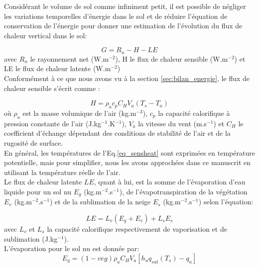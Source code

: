 \noindent Considérant le volume de sol comme infiniment petit, il est possible de négliger les variations temporelles d'énergie dans le sol et de réduire l'équation de conservation de l'énergie pour donner une estimation de l'évolution du flux de chaleur vertical dans le sol:

\begin{equation}
\label{eq_fluxsol_3L}
G = R_{n} - H - LE
\end{equation}
avec $R_{n}$ le rayonnement net (W.m$^{-2}$), H le flux de chaleur sensible (W.m$^{-2}$) et LE le flux de chaleur latente (W.m$^{-2}$)\\

\noindent Conformément à ce que nous avons vu à la section \ref{sec:bilan_energie}, le flux de chaleur sensible s'écrit comme : 

\begin{equation}
\label{eq_sensheat}
H = \rho_{a}c_{p}C_{H}V_{a}(T_{s}-T_{a})
\end{equation}
où $\rho_{a}$ est la masse volumique de l'air (kg.m$^{-3}$), $c_{p}$ la capacité calorifique à pression constante de l'air (J.kg$^{-1}$.K$^{-1}$), $V_{a}$ la vitesse du vent (m.s$^{-1}$) et $C_{H}$ le coefficient d'échange dépendant des conditions de stabilité de l'air et de la rugosité de surface.\\

\noindent En général, les températures de l'Eq.\ref{eq_sensheat} sont exprimées en température potentielle, mais pour simplifier, nous les avons approchées dans ce manuscrit en utilisant la température réelle de l'air.
\\

\noindent Le flux de chaleur latente $LE$, quant à lui, est la somme de l'évaporation d'eau liquide pour un sol nu $E_{g}$ (kg.m$^{-2}$.s$^{-1}$), de l'évapotranspiration de la végétation $E_{v}$ (kg.m$^{-2}$.s$^{-1}$) et de la sublimation de la neige $E_{s}$ (kg.m$^{-2}$.s$^{-1}$) selon l'équation:

\begin{equation}
\label{eq_latentheat}
LE = L_{v}(E_{g}+E_{v})+L_{s}E_{s}
\end{equation}
avec $L_{v}$ et $L_{s}$ la capacité calorifique respectivement de vaporisation et de sublimation (J.kg$^{-1}$). \\

\noindent L'évaporation pour le sol nu est donnée par:
\begin{equation}
\label{eq_evap_3L}
E_{g} = (1-veg)\rho_{a}C_{H}V_{a}[h_{u}q_{sat}(T_{s})-q_{a}]
\end{equation}

